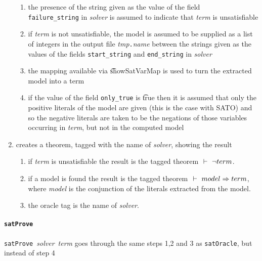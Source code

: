 \begin{enumerate}
\begin{enumerate}
\item the presence of the string given as the value of the
field \\ {\tt failure\_string} in {\it solver} is
assumed to indicate that {\it term} is unsatisfiable
\item if {\it term} is not unsatisfiable,
the model is assumed to be supplied as a list of integers in the output file 
{\it tmp}{\tt{.}}{\it{name}} between the strings
given as the values of the fields {\tt start\_string} and {\tt end\_string}
in {\it solver}
\item the mapping available via \t{showSatVarMap} is used
to turn the extracted model into a \HOL term
\item if the value of the field {\tt only\_true} is
\t{true} then it is assumed that only the positive literals
of the model are given (this is the case with SATO) and so
the negative literals are taken to be the negations of those variables
occurring in {\it term}, but not in the computed model
\end{enumerate}


\item creates a theorem, tagged with the name of {\it solver}, showing the result

\begin{enumerate}

\item if {\it term} is unsatisfiable the result is the tagged theorem $\ \vdash\  \neg term$.
\item if a model is found the result is the tagged theorem $\ \vdash\  model \Rightarrow term$,
where {\it model} is the conjunction of the literals extracted from the model.
\item the oracle tag is the name of {\it solver}.
\end{enumerate}
\end{enumerate}

\paragraph{\tt satProve}${}$\\
{\small{\tt satProve}~{\it solver}~{\it term}} goes through the same steps 1,2 and 3 
as {\tt satOracle}, but instead of step 4

